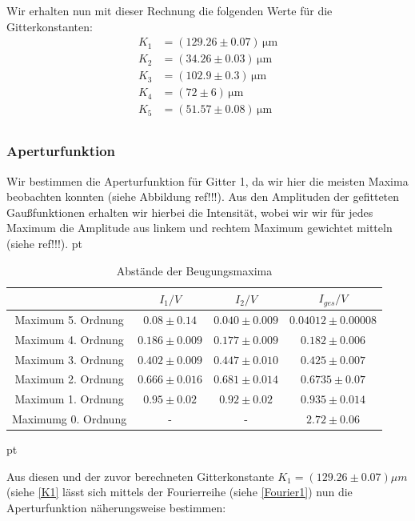 \documentclass[12pt]{article}
\begin{document}
Wir erhalten nun mit dieser Rechnung die folgenden Werte für die Gitterkonstanten:
\begin{align*}
	K_1&=(129.26\pm0.07)\,\mathrm{\mu m}\\
	K_2&=(34.26\pm0.03)\,\mathrm{\mu m}\\
	K_3&=(102.9\pm0.3)\,\mathrm{\mu m}\\
	K_4&=(72\pm6)\,\mathrm{\mu m}\\
	K_5&=(51.57\pm0.08)\,\mathrm{\mu m}\\  \label{K1}
\end{align*}


\subsubsection{Aperturfunktion}


Wir bestimmen die Aperturfunktion für Gitter 1, da wir hier die meisten Maxima beobachten konnten (siehe Abbildung ref!!!).
Aus den Amplituden der gefitteten  Gaußfunktionen erhalten wir hierbei die Intensität, wobei wir wir für jedes Maximum die Amplitude aus linkem und rechtem Maximum gewichtet mitteln (siehe ref!!!). 
  pt
 \begin{table}[h!]
 {\centering
\begin{tabular}{c||c|c|c}
 					& $I_1/V$ 	& $I_2/V$ & $I_{ges}/V$	\\ \hline\hline
Maximum 5. Ordnung     & $0.08 \pm 0.14$  & $0.040 \pm 0.009$      &  $0.04012 \pm  0.00008$                       \\ \hline
Maximum 4. Ordnung		& $0.186 \pm 0.009$ 	&  $0.177 \pm 0.009$    	&  $0.182 \pm 0.006$ \\ \hline 
Maximum 3. Ordnung	&	 $0.402 \pm 0.009$ 	   	&  $0.447 \pm 0.010$  	&  $0.425 \pm 0.007$  \\ \hline
Maximum 2. Ordnung    & $0.666 \pm 0.016$ & $0.681 \pm 0.014$ &   $0.6735 \pm 0.07$        \\ \hline                                           
Maximum 1. Ordnung      	&  $0.95 \pm 0.02$  	&  $0.92 \pm 0.02$  &  $0.935 \pm 0.014$  \\ \hline

Maximumg 0. Ordnung  & -  & - & $2.72 \pm 0.06$
 \end{tabular}
 \caption{Abstände der Beugungsmaxima}}
\end{table}
 pt


Aus diesen und der zuvor berechneten Gitterkonstante $K_1 = (129.26 \pm 0.07) \mu m$ (siehe \ref{K1} lässt sich mittels der Fourierreihe (siehe \ref{Fourier1}) nun die Aperturfunktion näherungsweise bestimmen:
\end{document}
